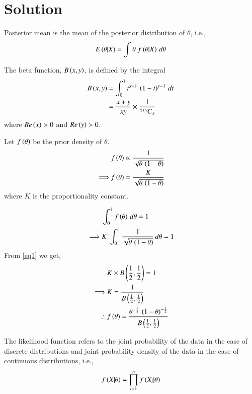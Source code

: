 \documentclass[journal,12pt,twocolumn]{IEEEtran}
\begin{document}
\section*{Solution}
\begin{definition}
Posterior mean is the mean of the posterior distribution of $\theta$, i.e., 
\begin{align}
    E\left(\theta|X\right) = \int{\theta\;f\ensuremath{\left(\theta|X\right)}\,d\theta}\label{eq5}
\end{align}

\end{definition}
\begin{definition}
The beta function, $B\left(x,y\right)$, is defined by the integral
\begin{align}
    B\left(x,y\right) &= \int_0^1 t^{x-1}\,\left(1-t\right)^{y-1}\,dt\nonumber\\
    &= \frac{x+y}{xy}\times \frac{1}{{{}^{x+y}\mkern-1muC_{x}}}\label{eq1}
\end{align}
where $Re\left(x\right)>0$ and $Re\left(y\right)>0$.
\end{definition}
Let $f\left(\theta\right)$ be the prior density of $\theta$.
\begin{align}
    &f\left(\theta\right) \propto \frac{1}{\sqrt{\theta\,\left(1-\theta\right)}}\nonumber\\
    \implies &f\left(\theta\right) = \frac{K}{\sqrt{\theta\,\left(1-\theta\right)}}
\end{align}
where $K$ is the proportionality constant.
\begin{lemma}
\begin{align}
    &\int_0^1 f\left(\theta\right)\,d\theta = 1\nonumber\\
    \implies &K\;\int_0^1 \frac{1}{\sqrt{\theta\,\left(1-\theta\right)}}\,d\theta =1
\end{align}
From \eqref{eq1} we get,
\begin{align}
    &K\times B\left(\frac{1}{2},\frac{1}{2}\right) = 1\nonumber\\
    \implies &K = \frac{1}{B\left(\frac{1}{2},\frac{1}{2}\right)}\\
    \therefore\, &f\left(\theta\right) = \frac{\theta^{-\frac{1}{2}}\,\left(1-\theta\right)^{-\frac{1}{2}}}{B\left(\frac{1}{2},\frac{1}{2}\right)}\label{eq6}
\end{align}
\end{lemma}
\begin{definition}
The likelihood function refers to the joint probability of the data in the case of discrete distributions and joint probability density of the data in the case of continuous distributions, i.e., 
\begin{align}
    f\left(X|\theta\right) = \prod_{i=1}^n f\left(X_i|\theta\right)\label{eq8}
\end{align}
\end{definition}
\end{document}
